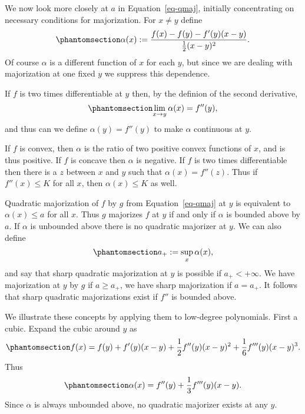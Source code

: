 \documentclass[
  12pt,
  letterpaper,
  DIV=11,
  numbers=noendperiod]{scrartcl}
\theoremstyle{definition}
\theoremstyle{definition}
\theoremstyle{plain}
\theoremstyle{plain}
\theoremstyle{plain}
\theoremstyle{remark}
\begin{document}
We now look more closely at \(a\) in Equation~\ref{eq-qmaj}, initially
concentrating on necessary conditions for majorization. For
\(x\not = y\) define \begin{equation}\phantomsection\label{eq-alpdef}{
\alpha(x):=\frac{f(x)-f(y)-f'(y)(x-y)}{\frac12(x-y)^2}.
}\end{equation} Of course \(\alpha\) is a different function of \(x\)
for each \(y\), but since we are dealing with majorization at one fixed
\(y\) we suppress this dependence.

If \(f\) is two times differentiable at \(y\) then, by the definion of
the second derivative, \begin{equation}\phantomsection\label{eq-alphop}{
\lim_{x\rightarrow y}\alpha(x)=f''(y),
}\end{equation} and thus can we define \(\alpha(y)=f''(y)\) to make
\(\alpha\) continuous at \(y\).

If \(f\) is convex, then \(\alpha\) is the ratio of two positive convex
functions of \(x\), and is thus positive. If \(f\) is concave then
\(\alpha\) is negative. If \(f\) is two times differentiable then there
is a \(z\) between \(x\) and \(y\) such that \(\alpha(x)=f''(z)\). Thus
if \(f''(x)\leq K\) for all \(x\), then \(\alpha(x)\leq K\) as well.

Quadratic majorization of \(f\) by \(g\) from Equation~\ref{eq-qmaj} at
\(y\) is equivalent to \(\alpha(x)\leq a\) for all \(x\). Thus \(g\)
majorizes \(f\) at \(y\) if and only if \(\alpha\) is bounded above by
\(a\). If \(\alpha\) is unbounded above there is no quadratic majorizer
at \(y\). We can also define
\begin{equation}\phantomsection\label{eq-aplus}{ 
a_+:=\sup_x\alpha(x),
}\end{equation} and say that sharp quadratic majorization at \(y\) is
possible if \(a_+<+\infty\). We have majorization at \(y\) by \(g\) if
\(a\geq a_+\), we have sharp majorization if \(a=a_+\). It follows that
sharp quadratic majorizations exist if \(f''\) is bounded above.

We illustrate these concepts by applying them to low-degree polynomials.
First a cubic. Expand the cubic around \(y\) as
\begin{equation}\phantomsection\label{eq-cubexp}{
f(x)=f(y)+f'(y)(x-y)+\frac12f''(y)(x-y)^2+\frac16f'''(y)(x-y)^3.
}\end{equation} Thus \begin{equation}\phantomsection\label{eq-cubalp}{
\alpha(x)=f''(y)+\frac13f'''(y)(x-y).
}\end{equation} Since \(\alpha\) is always unbounded above, no quadratic
majorizer exists at any \(y\).
\end{document}
